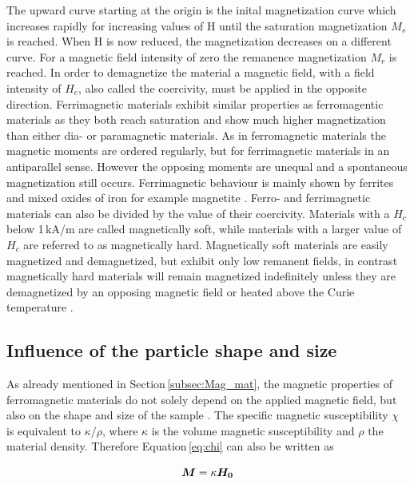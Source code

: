 The upward curve starting at the origin is the inital magnetization curve which increases rapidly for increasing values of H until the saturation magnetization $M_{s}$ is reached. When H is now reduced, the magnetization decreases on a different curve. For a magnetic field intensity of zero the remanence magnetization $M_{r}$ is reached. In order to demagnetize the material a magnetic field, with a field intensity of $H_{c}$, also called the coercivity, must be applied in the opposite direction\cite{svoboda2004magnetic,sung2003physics,aharoni2000introduction}. \newline
Ferrimagnetic materials exhibit similar properties as ferromagentic materials as they both reach saturation and show much higher magnetization than either dia- or paramagnetic materials. As in ferromagnetic materials the magnetic moments are ordered regularly, but for ferrimagnetic materials in an antiparallel sense. However the opposing moments are unequal and a spontaneous magnetization still occurs. Ferrimagnetic behaviour is mainly shown by ferrites and mixed oxides of iron for example magnetite \cite{svoboda2004magnetic,michalowsky2006magnettechnik}.\newline
Ferro- and ferrimagnetic materials can also be divided by the value of their coercivity. Materials with a $H_{c}$ below 1\,kA/m are called magnetically soft, while materials with a larger value of $H_{c}$ are referred to as magnetically hard. Magnetically soft materials are easily magnetized and demagnetized, but exhibit only low remanent fields, in contrast magnetically hard materials will remain magnetized indefinitely unless they are demagnetized by an opposing magnetic field or heated above the Curie temperature \cite{meschede2015gerthsen}\cite{michalowsky2006magnettechnik}. 

\subsection{Influence of the particle shape and size}
\label{subsec:part_shape}
As already mentioned in Section\,\ref{subsec:Mag_mat}, the magnetic properties of ferromagnetic materials do not solely depend on the applied magnetic field, but also on the shape and size of the sample \cite{gomez2009influence}. The specific magnetic susceptibility $\chi$ is equivalent to $\kappa/\rho$, where $\kappa$ is the volume magnetic susceptibility and $\rho$ the material density. Therefore Equation\,\ref{eq:chi} can also be written as

\begin{equation}
\label{eq:kappa}
\centering
\boldsymbol{M} = \kappa\boldsymbol{H_{0}}
\end{equation}

